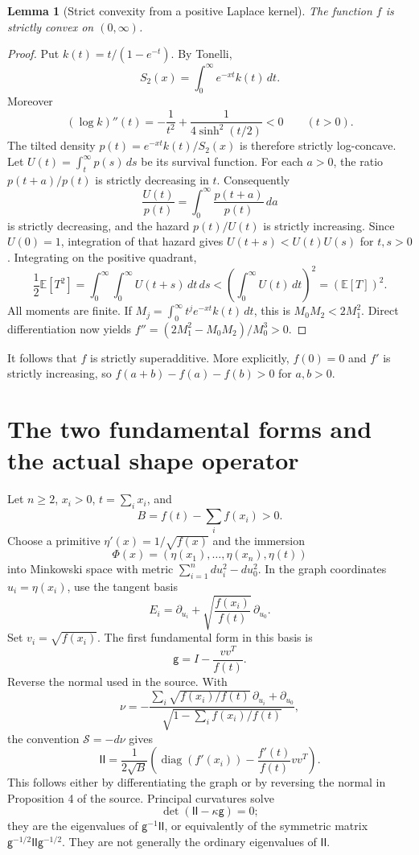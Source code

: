 \documentclass[11pt,a4paper]{article}
\newtheorem{lemma}{Lemma}
\newcommand{\diag}{\operatorname{diag}}
\begin{document}
\begin{lemma}[Strict convexity from a positive Laplace kernel]
The function $f$ is strictly convex on $(0,\infty)$.
\end{lemma}
\begin{proof}
Put $k(t)=t/(1-e^{-t})$. By Tonelli,
\[
 S_2(x)=\int_0^\infty e^{-xt}k(t)\,dt.
\]
Moreover
\[
 (\log k)''(t)=-\frac1{t^2}
                  +\frac1{4\sinh^2(t/2)}<0\qquad(t>0).
\]
The tilted density $p(t)=e^{-xt}k(t)/S_2(x)$ is therefore strictly
log-concave. Let $U(t)=\int_t^\infty p(s)\,ds$ be its survival function.
For each $a>0$, the ratio $p(t+a)/p(t)$ is strictly decreasing in $t$.
Consequently
\[
 \frac{U(t)}{p(t)}=\int_0^\infty\frac{p(t+a)}{p(t)}\,da
\]
is strictly decreasing, and the hazard $p(t)/U(t)$ is strictly increasing.
Since $U(0)=1$, integration of that hazard gives
$U(t+s)<U(t)U(s)$ for $t,s>0$. Integrating on the positive quadrant,
\[
 \frac12\mathbb E[T^2]
 =\int_0^\infty\!\!\int_0^\infty U(t+s)\,dt\,ds
 <\left(\int_0^\infty U(t)\,dt\right)^2
 =(\mathbb E[T])^2.
\]
All moments are finite. If
$M_j=\int_0^\infty t^je^{-xt}k(t)\,dt$, this is
$M_0M_2<2M_1^2$. Direct differentiation now yields
$f''=(2M_1^2-M_0M_2)/M_0^3>0$.
\end{proof}

It follows that $f$ is strictly superadditive. More explicitly,
$f(0)=0$ and $f'$ is strictly increasing, so
$f(a+b)-f(a)-f(b)>0$ for $a,b>0$.

\section{The two fundamental forms and the actual shape operator}
Let $n\ge2$, $x_i>0$, $t=\sum_i x_i$, and
\[
 B=f(t)-\sum_i f(x_i)>0.
\]
Choose a primitive $\eta'(x)=1/\sqrt{f(x)}$ and the immersion
\[
 \Phi(x)=(\eta(x_1),\ldots,\eta(x_n),\eta(t))
\]
into Minkowski space with metric
$\sum_{i=1}^n du_i^2-du_0^2$. In the graph coordinates $u_i=\eta(x_i)$,
use the tangent basis
\[
 E_i=\partial_{u_i}+\sqrt{\frac{f(x_i)}{f(t)}}\,\partial_{u_0}.
\]
Set $v_i=\sqrt{f(x_i)}$. The first fundamental form in this basis is
\[
 \mathsf g=I-\frac{vv^{\!T}}{f(t)}.
\tag{4}
\]
Reverse the normal used in the source. With
\[
 \nu=-\frac{\sum_i\sqrt{f(x_i)/f(t)}\,\partial_{u_i}+\partial_{u_0}}
                 {\sqrt{1-\sum_i f(x_i)/f(t)}},
\]
the convention $\mathcal S=-d\nu$ gives
\[
 \mathsf{II}=
 \frac1{2\sqrt B}\left(
   \diag(f'(x_i))-
   \frac{f'(t)}{f(t)}vv^{\!T}\right).
\tag{5}
\]
This follows either by differentiating the graph or by reversing the
normal in Proposition 4 of the source. Principal curvatures solve
\[
 \det(\mathsf{II}-\kappa\mathsf g)=0;
\tag{6}
\]
they are the eigenvalues of $\mathsf g^{-1}\mathsf{II}$, or equivalently
of the symmetric matrix $\mathsf g^{-1/2}\mathsf{II}\mathsf g^{-1/2}$.
They are not generally the ordinary eigenvalues of $\mathsf{II}$.
\end{document}
